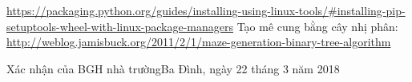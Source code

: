 \documentclass[a4paper,11pt]{article}
\begin{document}
\renewcommand{\refname}{D. TÀI LIỆU THAM KHẢO}
\begin{thebibliography}{99}
   \url{https://packaging.python.org/guides/installing-using-linux-tools/\#installing-pip-setuptools-wheel-with-linux-package-managers}
   Tạo mê cung bằng cây nhị phân:
  \url{http://weblog.jamisbuck.org/2011/2/1/maze-generation-binary-tree-algorithm}
\end{thebibliography}
Xác nhận của BGH nhà trường\hfill Ba Đình, ngày 22 tháng 3 năm 2018\\
\end{document}
